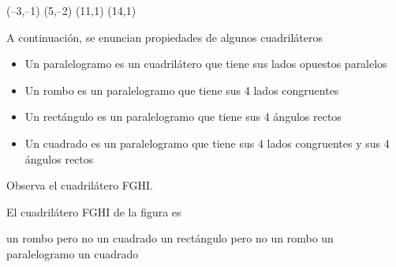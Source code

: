 \documentclass[addpoints]{exam}
\begin{document}
\begin{multicols}{2}
\begin{questions}
\begin{oneparchoices}
\choice (--3,--1)
\choice (5,--2)
\choice (11,1)
\CorrectChoice (14,1)
\end{oneparchoices}
\question \small A continuación, se enuncian propiedades de algunos cuadriláteros
\begin{itemize}
\item \small Un paralelogramo es un cuadrilátero que tiene sus lados opuestos paralelos
\item Un rombo es un paralelogramo que tiene sus 4 lados congruentes
\item Un rectángulo es un paralelogramo que tiene sus 4 ángulos rectos
\item Un cuadrado es un paralelogramo que tiene sus 4 lados congruentes y sus 4 ángulos rectos  
\end{itemize}
Observa el cuadrilátero FGHI.
\begin{center}
\end{center}
El cuadrilátero FGHI de la figura es
\begin{choices}
\choice un rombo pero no un cuadrado
\CorrectChoice un rectángulo pero no un rombo
\choice un paralelogramo
\choice un cuadrado
\end{choices}
\end{questions}
\end{multicols}
\end{document}
